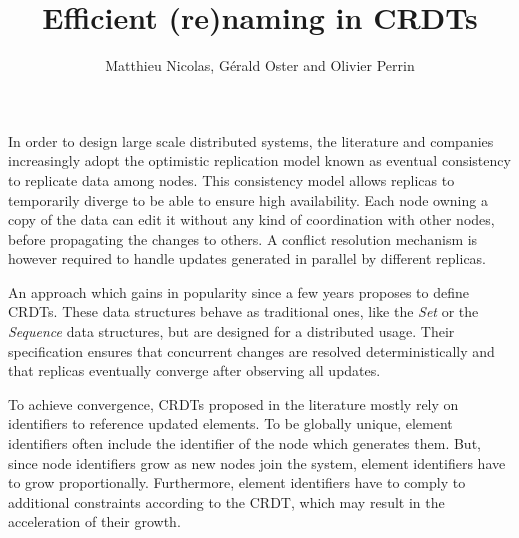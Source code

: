 \documentclass{article}
\title{Efficient (re)naming in \acp{CRDT}}
\author{Matthieu Nicolas, Gérald Oster and Olivier Perrin}
\begin{document}
\maketitle
\thispagestyle{empty}


In order to design large scale distributed systems, the literature and companies increasingly adopt the optimistic replication model known as eventual consistency to replicate data among nodes.
This consistency model allows replicas to temporarily diverge to be able to ensure high availability.
Each node owning a copy of the data can edit it without any kind of coordination with other nodes, before propagating the changes to others.
A conflict resolution mechanism is however required to handle updates generated in parallel by different replicas.


An approach which gains in popularity since a few years proposes to define \acfp{CRDT}.
These data structures behave as traditional ones, like the \emph{Set} or the \emph{Sequence} data structures, but are designed for a distributed usage.
Their specification ensures that concurrent changes are resolved deterministically and that replicas eventually converge after observing all updates.


To achieve convergence, \acp{CRDT} proposed in the literature mostly rely on identifiers to reference updated elements.
To be globally unique, element identifiers often include the identifier of the node which generates them.
But, since node identifiers grow as new nodes join the system, element identifiers have to grow proportionally.
Furthermore, element identifiers have to comply to additional constraints according to the \ac{CRDT}, which may result in the acceleration of their growth.
\end{document}
